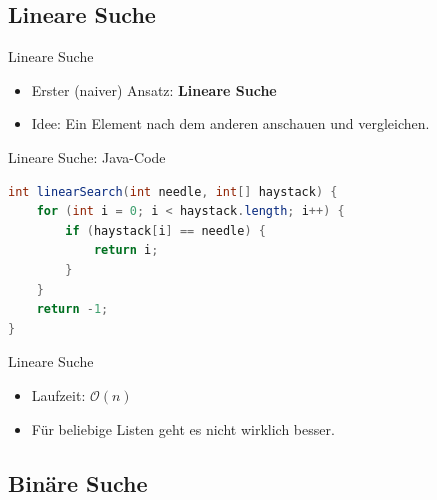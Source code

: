 \documentclass[18pt]{beamer}
\begin{document}
\subsection{Lineare Suche}

\begin{frame}{Lineare Suche}
    \begin{itemize}
        \item Erster (naiver) Ansatz: \textbf{Lineare Suche}
        \item Idee: Ein Element nach dem anderen anschauen und vergleichen.
    \end{itemize}
\end{frame}

\begin{frame}[fragile]{Lineare Suche: Java-Code}
    \begin{exampleblock}{}
        \begin{lstlisting}[language=Java,basicstyle=\scriptsize]
int linearSearch(int needle, int[] haystack) {
    for (int i = 0; i < haystack.length; i++) {
        if (haystack[i] == needle) {
            return i;
        }
    }
    return -1;
}
        \end{lstlisting}

    \end{exampleblock}

\end{frame}

\begin{frame}{Lineare Suche}
    \begin{itemize}
        \item Laufzeit: $\mathcal{O}(n)$
        \item Für beliebige Listen geht es nicht wirklich besser.
    \end{itemize}
\end{frame}

\subsection{Binäre Suche}
\end{document}

